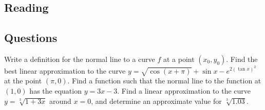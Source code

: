 


\subsection*{Reading}

\subsection*{Questions}
\begin{questions}
  \question Write a definition for the normal line to a curve $ f $ at a point $ (x_0, y_0) $.
  \question Find the best linear approximation to the curve $ y = \sqrt{\cos(x + \pi)} + \sin x - e^{2(\tan x)^2} $ at the point $ (\pi, 0) $.
  \question Find a function such that the normal line to the function at $ (1,0) $ has the equation $ y = 3x - 3 $.
  \question Find a linear approximation to the curve $ y = \sqrt[3]{1 + 3x} $ around $ x = 0 $, and determine an approximate value for $ \sqrt[3]{1.03} $.
\end{questions}


